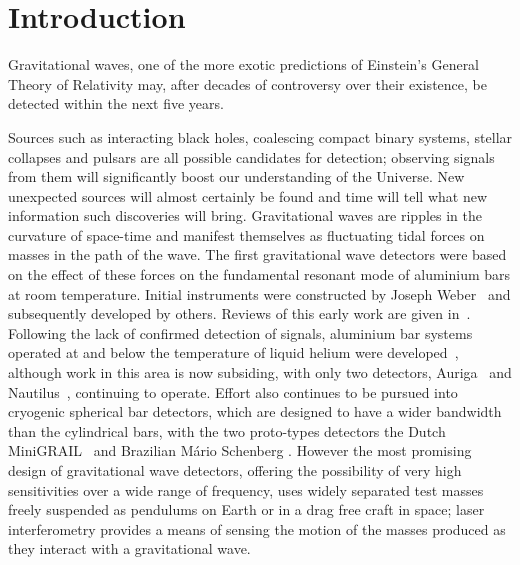 \documentclass{article}
\begin{document}

\newpage

\section{Introduction}
\label{section:introduction}

Gravitational waves, one of the more exotic predictions of Einstein's General
Theory of Relativity may, after decades of controversy over their existence, be
detected within the next five years.

Sources such as interacting black holes, coalescing compact binary systems,
stellar collapses and pulsars are all possible candidates for detection;
observing signals from them will significantly boost our understanding of the
Universe. New unexpected sources will almost certainly be found and time will
tell what new information such discoveries will bring. Gravitational waves are
ripples in the curvature of space-time and manifest themselves as fluctuating
tidal forces on masses in the path of the wave. The first gravitational wave
detectors were based on the effect of these forces on the fundamental resonant
mode of aluminium bars at room temperature. Initial instruments were constructed
by Joseph Weber~\cite{Weber1, Weber2} and subsequently developed by others.
Reviews of this early work are given in~\cite{Tyson, Douglass}. Following the
lack of confirmed detection of signals, aluminium bar systems operated at and
below the temperature of liquid helium were developed~\cite{Astone, Prodi,
Amaldi, Heng},
although work in this area is now subsiding, with only two detectors, Auriga~\cite{AURIGA} and Nautilus~\cite{NAUTILUS}, continuing to operate. Effort also continues to be pursued into cryogenic spherical bar detectors,
which are designed to have a wider bandwidth than the cylindrical bars, with the
two proto-types detectors the Dutch MiniGRAIL~\cite{MiniGRAIL, Gottardi:2007}
and Brazilian M\'{a}rio Schenberg \cite{Schenberg, Aguiar:2006}. However the
most promising design of gravitational wave detectors, offering the possibility
of very high sensitivities over a wide range of frequency, uses widely separated
test masses freely suspended as pendulums on Earth or in a drag free craft in
space; laser interferometry provides a means of sensing the motion of the masses
produced as they interact with a gravitational wave.
\end{document}
